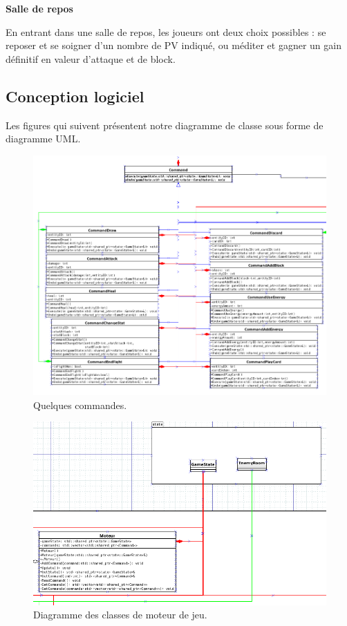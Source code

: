 \textbf{Salle de repos}

En entrant dans une salle de repos, les joueurs ont deux choix possibles : se reposer et se soigner d'un nombre de PV indiqué, ou méditer et gagner un gain définitif en valeur d'attaque et de block. 

\clearpage
\subsection{Conception logiciel}

Les figures qui suivent présentent notre diagramme de classe sous forme de diagramme UML.

\begin{figure}[hp]
\includegraphics[width=0.6\paperheight]{images/engine1.png}
\caption{\label{uml:engine}Quelques commandes.} 
\end{figure}

\begin{figure}[hp]
\includegraphics[width=0.5\paperheight]{images/engine2.png}
\caption{\label{uml:engine}Diagramme des classes de moteur de jeu.} 
\end{figure}

